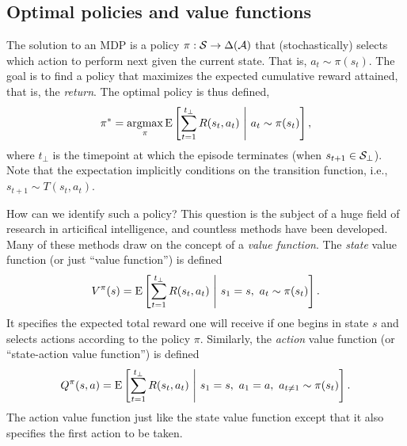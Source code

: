 

\subsection{Optimal policies and value functions}

The solution to an MDP is a policy $\pi: \S \rightarrow \Delta(\A)$ that (stochastically) selects which action to perform next given the current state. That is, $a_t \sim \pi(s_t)$. The goal is to find a policy that maximizes the expected cumulative reward attained, that is, the \emph{return}. The optimal policy is thus defined,
\begin{equation}\label{eq:optimal-policy}
  \pi^* = \argmax_\pi \expect{
    \sum_{t=1}^{t_\bot} R(s_t, a_t)
  }{
   a_t \sim \pi(s_t)
  },
\end{equation}
where $t_\bot$ is the timepoint at which the episode terminates (when $s_{t+1} \in \S_\bot$). Note that the expectation implicitly conditions on the transition function, i.e., $s_{t+1} \sim T(s_t, a_t)$.

How can we identify such a policy? This question is the subject of a huge field of research in articifical intelligence, and countless methods have been developed. Many of these methods draw on the concept of a \emph{value function}. The \emph{state} value function (or just ``value function'') is defined
%
\begin{equation}\label{eq:state-value}
  V^\pi(s) = \expect{
    \sum_{t=1}^{t_\bot} R(s_t, a_t)
  }{
   s_1 = s,\ a_t \sim \pi(s_t)
  }.
\end{equation}
%
It specifies the expected total reward one will receive if one begins in state $s$ and selects actions according to the policy $\pi$. Similarly, the \emph{action} value function (or ``state-action value function'') is defined
%
\begin{equation}\label{eq:action-value}
  Q^\pi(s, a) = \expect{
    \sum_{t=1}^{t_\bot} R(s_t, a_t)
  }{
   s_1 = s,\ a_1 = a,\ a_{t \neq 1} \sim \pi(s_t)
  }.
\end{equation}
%
The action value function just like the state value function except that it also specifies the first action to be taken. 

